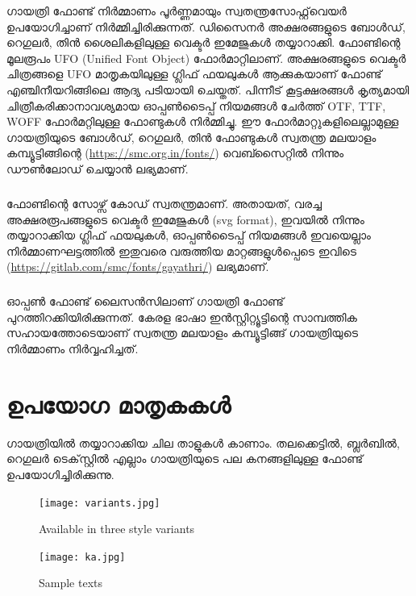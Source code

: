 \documentclass[a4paper, 12pt]{report}
\begin{document}
	ഗായത്രി ഫോണ്ട് നിര്‍മ്മാണം പൂര്‍ണ്ണമായും സ്വതന്ത്രസോഫ്റ്റ്‌വെയർ ഉപയോഗിച്ചാണ് നിർമ്മിച്ചിരിക്കുന്നത്. ഡിസൈനര്‍ അക്ഷരങ്ങളുടെ ബോള്‍ഡ്, റെഗുലര്‍, തിന്‍ ശൈലികളിലുള്ള വെക്ടര്‍ ഇമേജുകള്‍ തയ്യാറാക്കി. ഫോണ്ടിന്റെ മൂലരൂപം UFO (Unified Font Object) ഫോര്‍മാറ്റിലാണ്. അക്ഷരങ്ങളുടെ വെക്ടർ ചിത്രങ്ങളെ UFO മാതൃകയിലുള്ള ഗ്ലിഫ് ഫയലുകള്‍ ആക്കുകയാണ് ഫോണ്ട് എഞ്ചിനീയറിങ്ങിലെ ആദ്യ പടിയായി ചെയ്തത്. പിന്നീട് കൂട്ടക്ഷരങ്ങള്‍ കൃത്യമായി ചിത്രീകരിക്കാനാവശ്യമായ ഓപ്പണ്‍ടൈപ്പ് നിയമങ്ങള്‍ ചേര്‍ത്ത്  OTF, TTF, WOFF ഫോര്‍മറ്റിലുള്ള ഫോണ്ടുകള്‍ നിര്‍മ്മിച്ചു. ഈ ഫോര്‍മാറ്റുകളിലെല്ലാമുള്ള ഗായത്രിയുടെ ബോള്‍ഡ്, റെഗുലര്‍, തിന്‍ ഫോണ്ടുകള്‍ സ്വതന്ത്ര മലയാളം കമ്പ്യൂട്ടിങ്ങിന്റെ (\url{https://smc.org.in/fonts/}) വെബ്സൈറ്റിൽ നിന്നും ഡൗണ്‍ലോഡ് ചെയ്യാന്‍ ലഭ്യമാണ്.
	
	\paragraph{}
	ഫോണ്ടിന്റെ സോഴ്സ് കോഡ് സ്വതന്ത്രമാണ്. അതായത്, വരച്ച അക്ഷരരൂപങ്ങളുടെ വെക്ടര്‍ ഇമേജുകള്‍ (svg format), ഇവയില്‍ നിന്നും തയ്യാറാക്കിയ ഗ്ലിഫ് ഫയലുകള്‍, ഓപ്പണ്‍ടൈപ്പ്  നിയമങ്ങള്‍ ഇവയെല്ലാം നിര്‍മ്മാണഘട്ടത്തില്‍ ഇതുവരെ വരുത്തിയ മാറ്റങ്ങളുള്‍പ്പെടെ ഇവിടെ (\url{https://gitlab.com/smc/fonts/gayathri/}) ലഭ്യമാണ്.
	
	\paragraph{}
		ഓപ്പണ്‍ ഫോണ്ട് ലൈസന്‍സിലാണ് ഗായത്രി ഫോണ്ട് പുറത്തിറക്കിയിരിക്കുന്നത്.  കേരള ഭാഷാ ഇൻസ്റ്റിറ്റ്യൂട്ടിന്റെ സാമ്പത്തിക സഹായത്തോടെയാണ്  സ്വതന്ത്ര മലയാളം കമ്പ്യൂട്ടിങ്ങ് ഗായത്രിയുടെ നിർമ്മാണം നിർവ്വഹിച്ചത്.
	
	\newpage
	\clearpage
	
	\chapter*{ഉപയോഗ മാതൃകകള്‍‍}
	
	ഗായത്രിയിൽ തയ്യാറാക്കിയ ചില താളുകൾ കാണാം. തലക്കെട്ടിൽ, ബ്ലർബിൽ, റെഗുലർ ടെക്‌സ്റ്റിൽ എല്ലാം ഗായത്രിയുടെ പല കനങ്ങളിലുള്ള  ഫോണ്ട് ഉപയോഗിച്ചിരിക്കുന്നു.

	\begin{figure}
		\begin{centering}
			\texttt{[image: variants.jpg]}
			\caption{Available in three style variants}
			\label{variants}
		\end{centering}
	\end{figure}
	
	\begin{figure}
		\begin{centering}
			\texttt{[image: ka.jpg]}
			\caption{Sample texts}
			\label{sample-ka}
		\end{centering}
	\end{figure}
	
\end{document}
